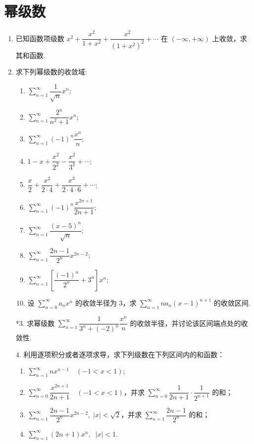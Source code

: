 \section{幂级数}

\begin{enumerate}\setlength{\itemsep}{7pt}
    \item 已知函数项级数 $x^2+\dfrac{x^2}{1+x^2}+\dfrac{x^2}{(1+x^2)^2}+\cdots$ 在 $(-\infty, +\infty)$ 上收敛，求其和函数.
    
    \item 求下列幂级数的收敛域:
    \begin{enumerate}[(1)]\setlength{\itemsep}{10pt}\setlength{\topsep}{15pt}
        \item $\displaystyle \sum_{n=1}^{\infty}\dfrac{1}{\sqrt{n}}x^n$;
        \item $\displaystyle \sum_{n=1}^{\infty}\dfrac{2^n}{n^2+1}x^n$;
        \item $\displaystyle \sum_{n=1}^{\infty}(-1)^n\dfrac{x^n}{n}$;
        \item $\displaystyle 1-x+\dfrac{x^2}{2^2}-\dfrac{x^2}{3^2}+\cdots$;
        \item $\displaystyle \dfrac{x}{2}+\dfrac{x^2}{2\cdot4}+\dfrac{x^3}{2\cdot4\cdot6}+\cdots$;
        \item $\displaystyle \sum_{n=1}^{\infty}(-1)^n\dfrac{x^{2n+1}}{2n+1}$;
        \item $\displaystyle \sum_{n=1}^{\infty}\dfrac{(x-5)^n}{\sqrt{n}}$;
        \item $\displaystyle \sum_{n=1}^{\infty}\dfrac{2n-1}{2^n}x^{2n-2}$;
        \item $\displaystyle \sum_{n=1}^{\infty}\left[\dfrac{(-1)^n}{2^n}+3^n\right]x^n$;
        \item 设 $\displaystyle \sum_{n=0}^{\infty}a_nx^n$ 的收敛半径为 $3$，求 $\displaystyle\sum_{n=1}^{\infty}na_n(x-1)^{n+1}$ 的收敛区间.
    \end{enumerate}

    \item[*3.] 求幂级数 $\sum_{n=1}^{\infty}\dfrac{1}{3^n+(-2)^n}\dfrac{x^n}{n}$ 的收敛半径，并讨论该区间端点处的收敛性.
    
    \item[4.] 利用逐项积分或者逐项求导，求下列级数在下列区间内的和函数：
    \begin{enumerate}[(1)]\setlength{\itemsep}{10pt}\setlength{\topsep}{15pt}
        \item $\displaystyle \sum_{n=1}^{\infty}nx^{n-1}\quad(-1<x<1)$;
        \item $\displaystyle \sum_{n=0}^{\infty}\dfrac{x^{2n+1}}{2n+1}\quad(-1<x<1)$，并求 $\displaystyle \sum_{n=0}^{\infty}\dfrac{1}{2n+1}\cdot\dfrac{1}{2^{n+1}}$ 的和；
        \item $\displaystyle \sum_{n=1}^{\infty}\dfrac{2n-1}{2^n}x^{2n-2},\;|x|<\sqrt{2}$，并求 $\displaystyle \sum_{n=1}^{\infty}\dfrac{2n-1}{2^n}$ 的和；
        \item $\displaystyle \sum_{n=1}^{\infty}(2n+1)x^n,\;\;|x|<1$.
    \end{enumerate}   


\end{enumerate}

